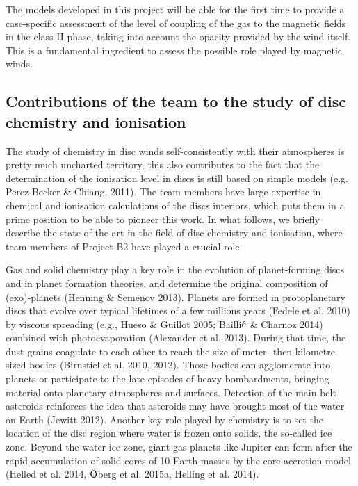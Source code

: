 \documentclass[10pt,fleqn,twoside]{article}
\begin{document}
The models developed in this project will be able for the first time to provide a case-specific assessment of the level of coupling of the gas to the magnetic fields in the class II phase, taking into account the opacity provided by the wind itself. This is a fundamental ingredient to assess the possible role played by magnetic winds. 

\subsection{Contributions of the team to the study of disc chemistry and ionisation}
The study of chemistry in disc winds self-consistently with their atmospheres is pretty much uncharted territory, this also contributes to the fact that the determination of the ionisation level in discs is still based on simple models (e.g. Perez-Becker \& Chiang, 2011). The team members have large expertise in chemical and ionisation calculations of the discs interiors, which puts them in a prime position to be able to pioneer this work. In what follows, we briefly describe the state-of-the-art in the field of disc chemistry and ionisation, where team members of Project B2 have played a crucial role. 


Gas and solid chemistry play a key role in the evolution of planet-forming discs and in planet formation theories, and determine the original composition of (exo)-planets (Henning \& Semenov 2013).  Planets are formed in protoplanetary discs that evolve over typical lifetimes of a few millions years (Fedele et al. 2010) by viscous spreading (e.g., Hueso \& Guillot 2005; Bailli$\acute{\textsf e}$ \& Charnoz 2014) combined with photoevaporation (Alexander et al. 2013). During that time, the dust grains coagulate to each other to reach the size of meter- then kilometre- sized bodies (Birnstiel et al. 2010, 2012). Those bodies can agglomerate into planets or participate to the late episodes of heavy bombardments, bringing material onto planetary atmospheres and surfaces. Detection of the main belt asteroids reinforces the idea that asteroids may have brought most of the water on Earth (Jewitt 2012). Another key role played by chemistry is to set the location of the disc region where water is frozen onto solids, the so-called ice zone. Beyond the water ice zone, giant gas planets like Jupiter can form after the rapid accumulation of solid cores of 10 Earth masses by the core-accretion model (Helled et al. 2014, $\ddot{\textsf O}$berg et al. 2015a, Helling et al. 2014).
\end{document}
